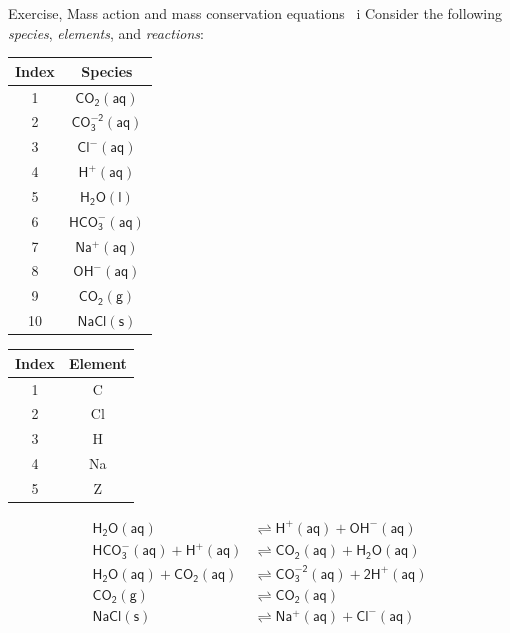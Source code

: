 \begin{frame}{Exercise, Mass action and mass conservation equations \, i}
Consider the following \emph{species}, \emph{elements}, and\emph{
reactions}:

\footnotesize
\lcol[0.3]

\begin{center}
\begin{tabular}{cc}
\toprule 
\textbf{Index} & \textbf{Species}\tabularnewline
\midrule
1 & \textrm{$\mathsf{CO_{2}(aq)}$}\tabularnewline
2 & \textrm{$\mathsf{CO_{3}^{-2}(aq)}$}\tabularnewline
3 & \textrm{$\mathsf{Cl^{-}(aq)}$}\tabularnewline
4 & \textrm{$\mathsf{H^{+}(aq)}$}\tabularnewline
5 & \textrm{$\mathsf{H_{2}O(l)}$}\tabularnewline
6 & \textrm{$\mathsf{HCO_{3}^{-}(aq)}$}\tabularnewline
7 & \textrm{$\mathsf{Na^{+}(aq)}$}\tabularnewline
8 & \textrm{$\mathsf{OH^{-}(aq)}$}\tabularnewline
9 & \textrm{$\mathsf{CO_{2}(g)}$}\tabularnewline
10 & \textrm{$\mathsf{NaCl(s)}$}\tabularnewline
\bottomrule
\end{tabular}
\par\end{center}

\rcol[0.1]
\begin{center}
\begin{tabular}{cc}
\toprule 
\textbf{Index} & \textbf{Element}\tabularnewline
\midrule
1 & C\tabularnewline
2 & Cl\tabularnewline
3 & H\tabularnewline
4 & Na\tabularnewline
5 & Z\tabularnewline
\bottomrule
\end{tabular}
\par\end{center}

\rcol[0.6]

\begin{align*}
\mathsf{H_{2}O(aq)} & \mathsf{\rightleftharpoons H^{+}(aq)+OH^{-}(aq)}\tag{1}\\
\mathsf{HCO_{3}^{-}(aq)+H^{+}(aq)} & \mathsf{\rightleftharpoons CO_{2}(aq)+H_{2}O(aq)}\tag{2}\\
\mathsf{H_{2}O(aq)+CO_{2}(aq)} & \mathsf{\rightleftharpoons CO_{3}^{-2}(aq)+2H^{+}(aq)}\tag{3}\\
\mathsf{CO_{2}(g)} & \mathsf{\rightleftharpoons CO_{2}(aq)}\tag{4}\\
\mathsf{NaCl(s)} & \mathsf{\rightleftharpoons Na^{+}(aq)+Cl^{-}(aq)}\tag{5}
\end{align*}

\ecol
\end{frame}
%

